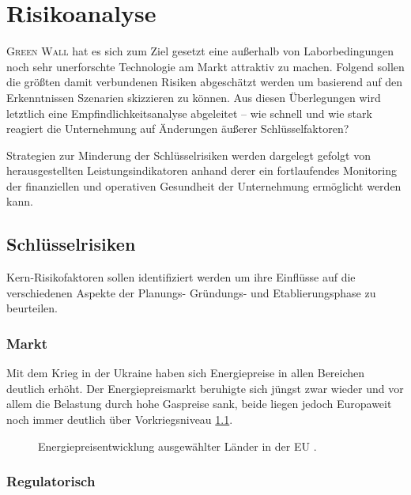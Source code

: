 \chapter{Risikoanalyse}

\textsc{Green Wall} hat es sich zum Ziel gesetzt eine außerhalb von Laborbedingungen noch sehr unerforschte Technologie am Markt attraktiv zu machen.
Folgend sollen die größten damit verbundenen Risiken abgeschätzt werden um basierend auf den Erkenntnissen Szenarien skizzieren zu können.
Aus diesen Überlegungen wird letztlich eine Empfindlichkeitsanalyse abgeleitet -- wie schnell und wie stark reagiert die Unternehmung auf Änderungen äußerer Schlüsselfaktoren?\par\medskip

Strategien zur Minderung der Schlüsselrisiken werden dargelegt gefolgt von herausgestellten Leistungsindikatoren anhand derer ein fortlaufendes Monitoring der finanziellen und operativen Gesundheit der Unternehmung ermöglicht werden kann.

\section{Schlüsselrisiken}

Kern-Risikofaktoren sollen identifiziert werden um ihre Einflüsse auf die verschiedenen Aspekte der Planungs- Gründungs- und Etablierungsphase zu beurteilen.

\subsection{Markt}

Mit dem Krieg in der Ukraine haben sich Energiepreise in allen Bereichen deutlich erhöht.
Der Energiepreismarkt beruhigte sich jüngst zwar wieder und vor allem die Belastung durch hohe Gaspreise sank, beide liegen jedoch Europaweit noch immer deutlich über Vorkriegsniveau \cref{fig:energiepreise}.

\begin{figure}[h]
    \centering
    
    \caption[Energiepreisentwicklung ausgewählter Länder in der EU]{Energiepreisentwicklung ausgewählter Länder in der EU \cite{Dataset.Eurostat.EnergyStatisticsNaturalGasAndElectricityPricesfrom2007Onwards.2024}.}\label{fig:energiepreise}
\end{figure}


\subsection{Regulatorisch}

